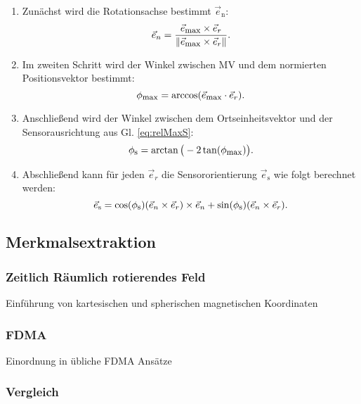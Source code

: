 	\begin{enumerate}

		\item Zunächst wird die Rotationsachse bestimmt $\vec{e}_\text{n}$:
		\begin{equation}
			\vec{e}_n = \frac{\vec{e}_{\textrm{\footnotesize{max}}} \times \vec{e}_r }{\|\vec{e}_{\textrm{\footnotesize{max}}} \times \vec{e}_r\|}.
			\label{eq:formel15}
		\end{equation}
		
		\item Im zweiten Schritt wird der Winkel zwischen MV und dem normierten Positionsvektor bestimmt:
		\begin{equation}
			\phi_{\textrm{\footnotesize{max}}} = \arccos(\vec{e}_{\textrm{\footnotesize{max}}} \cdot \vec{e}_r).
			\label{eq:formel16}
		\end{equation}
		
		\item Anschließend wird der Winkel zwischen dem Ortseinheitsvektor und der Sensorausrichtung aus Gl. \ref{eq:relMaxS}:
		\begin{equation}
			\phi_{\textrm{\footnotesize{s}}} = \arctan\big(-2\tan(\phi_{\textrm{\footnotesize{max}}})\big).
			\label{eq:formel17}
		\end{equation}
		
		\item  Abschließend kann für jeden $\vec e_r$ die Sensororientierung $\vec e_\text{s}$ wie folgt berechnet werden:
		\begin{equation}
			\vec{e}_\text{s} = \cos(\phi_{\textrm{\footnotesize{s}}})(\vec{e}_n \times \vec{e}_r)\times \vec{e}_n + \sin(\phi_{\textrm{\footnotesize{s}}}) (\vec{e}_n \times\vec{e}_r).
			\label{eq:formel18}
		\end{equation}
		
		\end{enumerate}
	\subsection{Merkmalsextraktion}

	\subsubsection{Zeitlich Räumlich rotierendes Feld}
	Einführung von kartesischen und spherischen magnetischen Koordinaten		
	\subsubsection{FDMA}
	Einordnung in übliche FDMA Ansätze
	\subsubsection{Vergleich}
		
